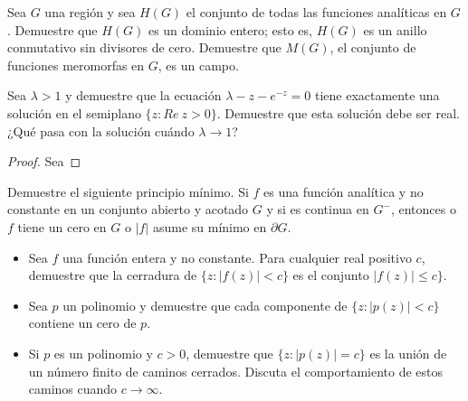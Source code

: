 \documentclass[12pt]{article}
\newenvironment{problem}[2][Problema]{\begin{trivlist}
\item[\hskip \labelsep {\bfseries #1}\hskip \labelsep {\bfseries #2.}]}{\end{trivlist}}
\begin{document}
\begin{problem}{6. pp. 126} Sea $G$ una región y sea $H(G)$ el conjunto de todas las funciones analíticas en $G$. Demuestre que $H(G)$ es un dominio entero; esto es, $H(G)$ es un anillo conmutativo sin divisores de cero. Demuestre que $M(G)$, el conjunto de funciones meromorfas en $G$, es un campo.
\end{problem}

\begin{problem}{9. pp. 126} Sea $\lambda > 1$ y demuestre que la ecuación $\lambda - z - e^{-z} = 0$ tiene exactamente una solución en el semiplano $\{z: Re \ z > 0 \}.$ Demuestre que esta solución debe ser real. ¿Qué pasa con la solución cuándo $\lambda \to 1$?
\end{problem}
\begin{proof}
Sea
\end{proof}

\begin{problem}{1. pp. 129} Demuestre el siguiente principio mínimo. Si $f$ es una función analítica y no constante en un conjunto abierto y acotado $G$ y si es continua en $G^{-}$, entonces o $f$ tiene un cero en $G$ o $\vert f \rvert$ asume su mínimo en $\partial G.$ 
\end{problem}

\begin{problem}{3. pp. 130} \text{ }
\begin{itemize}
    \item[(a)] Sea $f$ una función entera y no constante. Para cualquier real positivo $c$, demuestre que la cerradura de $\{z: \lvert f(z) \rvert < c\}$ es el conjunto $\lvert f(z) \rvert \leq c \}.$
    \item[(b)] Sea $p$ un polinomio y demuestre que cada componente de $\{z: \lvert p(z) \rvert < c \}$ contiene un cero de $p$. 
    \item[(c)] Si $p$ es un polinomio y $c > 0$, demuestre que $\{z: \lvert p(z) \rvert = c\}$ es la unión de un número finito de caminos cerrados. Discuta el comportamiento de estos caminos cuando $c \to \infty.$
\end{itemize}

\end{problem}
\end{document}
